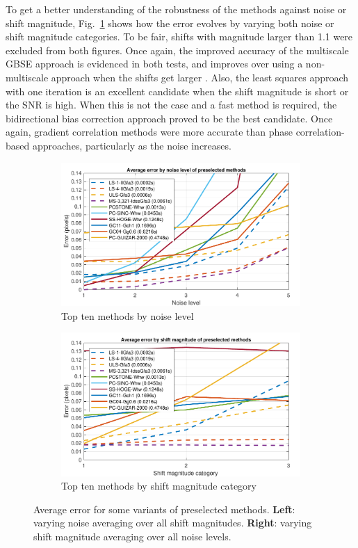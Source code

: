 To get a better understanding of the robustness of the methods against noise or shift magnitude, Fig.~\ref{fig:preselectedFigShiftEstimation} shows how the error evolves by varying both noise or shift magnitude categories. To be fair, shifts with magnitude larger than 1.1 were excluded from both figures. Once again, the improved accuracy of the multiscale GBSE approach is evidenced in both tests, and improves over using a non-multiscale approach when the shifts get larger \cite{RaisMF15}. Also, the least squares approach with one iteration is an excellent candidate when the shift magnitude is short or the SNR is high. When this is not the case and a fast method is required, the bidirectional bias correction approach proved to be the best candidate. Once again, gradient correlation methods were more accurate than phase correlation-based approaches, particularly as the noise increases.
\begin{figure}[htpb]
\begin{subfigure}{.5\textwidth}
\includegraphics[width=\textwidth]{img/GroupedTop10ByNoise}
\caption{Top ten methods by noise level}
\end{subfigure}%
\begin{subfigure}{.5\textwidth}
\includegraphics[width=\textwidth]{img/groupedTop10ByShift}
\caption{Top ten methods by shift magnitude category}
\end{subfigure}
\caption{Average error for some variants of preselected methods. \textbf{Left}: varying noise averaging over all shift magnitudes. \textbf{Right}: varying shift magnitude averaging over all noise levels.}
\label{fig:preselectedFigShiftEstimation}
\end{figure}

